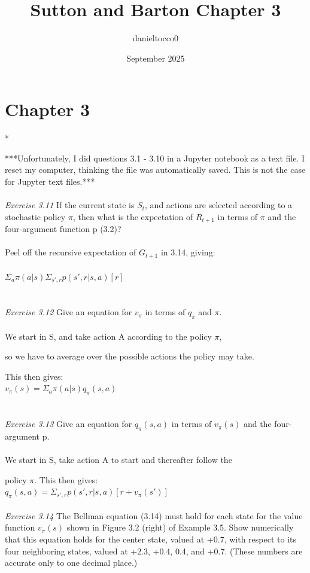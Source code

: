 \documentclass{article}
\title{Sutton and Barton Chapter 3}
\author{danieltocco0 }
\date{September 2025}
\begin{document}
\maketitle

\section{Chapter 3} *

***Unfortunately, I did questions 3.1 - 3.10 in a Jupyter notebook as a text file. I reset my computer, thinking the file was automatically saved. This is not the case for Jupyter text files.***\\\\
\textit{Exercise 3.11} If the current state is $S_t$, and actions are selected according to a stochastic
policy $\pi$, then what is the expectation of $R_{t+1}$ in terms of $\pi$ and the four-argument
function p (3.2)?
\\
\\
Peel off the recursive expectation of $G_{t+1}$ in 3.14, giving: 
\\
\\

$\Sigma_{a}\pi(a|s)\Sigma_{s', r}p(s', r|s, a)[r]$\\
\\\\
\textit{Exercise 3.12} Give an equation for $v_\pi$ in terms of $q_\pi$ and $\pi$.\\
\\

We start in S, and take action A according to the policy $\pi$, 

so we have to average over the possible actions the policy may take. 

This then gives: \\

$v_\pi(s) = \Sigma_{a}\pi(a|s)q_\pi(s, a)$\\
\\\\
\textit{Exercise 3.13} Give an equation for $q_\pi(s, a)$ in terms of $v_\pi(s)$ and the four-argument p.\\
\\

We start in S, take action A to start and thereafter follow the 

policy $\pi$. This then gives: \\

$q_\pi(s, a) = \Sigma_{s', r}p(s', r|s, a)[r + v_\pi(s')]$
\\\\
\textit{Exercise 3.14} The Bellman equation (3.14) must hold for each state for the value function $v_\pi(s)$ shown in Figure 3.2 (right) of Example 3.5. Show numerically that this equation holds
for the center state, valued at +0.7, with respect to its four neighboring states, valued at +2.3, +0.4, 0.4, and +0.7. (These numbers are accurate only to one decimal place.)\\
\\
\end{document}
